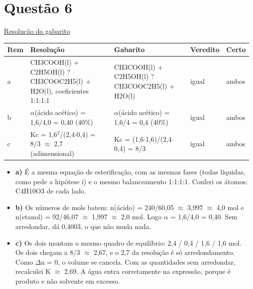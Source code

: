 \documentclass{article}%
\begin{document}
\section*{Questão 6}%
\href{https://poliedroresolve.sistemapoliedro.com.br/vestibulares/ime/2027/ime-2-fase-dia-3-28-10-2026-2-fase-dia-3/dissertativa-6-quimica-2-fase-dia-3-ime-2027}{Resolução do gabarito}\par\smallskip%
\begin{longtable}{@{}p{} p{} p{} p{} p{}@{}}\toprule Item & Resolução & Gabarito & Veredito & Certo \\ \midrule
a & CH3COOH(l) + C2H5OH(l) ? CH3COOC2H5(l) + H2O(l), coeficientes 1:1:1:1 & CH3COOH(l) + C2H5OH(l) ? CH3COOC2H5(l) + H2O(l) & igual & ambos \\
b & $\alpha$(ácido acético) = 1,6/4,0 = 0,40 (40\%) & $\alpha$(ácido acético) = 1,6/4 = 0,4 (40\%) & igual & ambos \\
c & Kc = 1,6$^2$/(2,4$\cdot$0,4) = 8/3 $\approx$ 2,7 (adimensional) & Kc = (1,6$\cdot$1,6)/(2,4$\cdot$0,4) = 8/3 & igual & ambos \\
\bottomrule\end{longtable}%
\begin{itemize}%
\item%
\textbf{a)} É a mesma equação de esterificação, com as mesmas fases (todas líquidas, como pede a hipótese i) e o mesmo balanceamento 1:1:1:1. Conferi os átomos: C4H10O3 de cada lado.%
\item%
\textbf{b)} Os números de mols batem: n(ácido) = 240/60,05 $\approx$ 3,997 $\approx$ 4,0 mol e n(etanol) = 92/46,07 $\approx$ 1,997 $\approx$ 2,0 mol. Logo $\alpha$ = 1,6/4,0 = 0,40. Sem arredondar, dá 0,4003, o que não muda nada.%
\item%
\textbf{c)} Os dois montam o mesmo quadro de equilíbrio: 2,4 / 0,4 / 1,6 / 1,6 mol. Os dois chegam a 8/3 $\approx$ 2,67, e o 2,7 da resolução é só arredondamento. Como $\Delta$n = 0, o volume se cancela. Com as quantidades sem arredondar, recalculei K $\approx$ 2,69. A água entra corretamente na expressão, porque é produto e não solvente em excesso.%
\end{itemize}%
\end{document}
